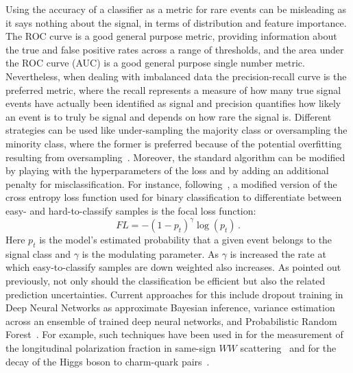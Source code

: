 Using the accuracy of a classifier as a metric for rare events can be misleading as it says nothing about the signal, in terms of distribution and feature importance. The ROC curve is a good general purpose metric, providing information about the true and false positive rates across a range of thresholds, and the area under the ROC curve (AUC) is a good general purpose single number metric.
Nevertheless, when dealing with imbalanced data the precision-recall curve is the preferred metric, where the recall represents a measure of how many true signal events have actually been identified as signal and precision quantifies how likely an event is to truly be signal and depends on how rare the signal is. Different strategies can be used like under-sampling the majority class or oversampling the minority class, where the former is preferred because of the potential overfitting resulting from oversampling~\cite{Nguyen2009BorderlineOF}. Moreover, the standard algorithm can be modified by playing with the hyperparameters of the loss and by adding an additional penalty for misclassification. For instance, following~\cite{focalLF}, a modified version of the cross entropy loss function used for binary classification to differentiate between easy- and hard-to-classify samples is the focal loss function: 
\begin{equation}
FL = -(1-p_t)^\gamma \log(p_t) \, .
\end{equation}
Here $p_t$ is the model’s estimated probability that a given event belongs to the signal class and $\gamma$ is the modulating parameter. As $\gamma$ is increased the rate at which easy-to-classify samples are down weighted also increases.
As pointed out previously, not only should the classification be efficient but also the related prediction uncertainties.
Current approaches for this include dropout training in Deep Neural Networks as approximate Bayesian inference, variance estimation across an ensemble of trained deep neural networks, and Probabilistic Random Forest~\cite{modeluncertainty}.
For example, such techniques have been used in for the measurement of the longitudinal polarization fraction in same-sign $WW$ scattering~\cite{Ballestrero_2018} and for the decay of the Higgs boson to charm-quark pairs~\cite{Aaboud_2018}.

